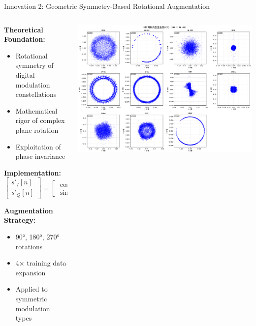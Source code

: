 \documentclass[aspectratio=169]{beamer}
\begin{document}
\begin{frame}{Innovation 2: Geometric Symmetry-Based Rotational Augmentation}
\begin{columns}
\begin{column}{0.5\textwidth}
\textbf{Theoretical Foundation:}
\begin{itemize}
\item Rotational symmetry of digital modulation constellations
\item Mathematical rigor of complex plane rotation
\item Exploitation of phase invariance
\end{itemize}

\textbf{Implementation:}
\begin{equation}
\begin{bmatrix} s'_I[n] \\ s'_Q[n] \end{bmatrix} = \begin{bmatrix} \cos\theta & -\sin\theta \\ \sin\theta & \cos\theta \end{bmatrix} \begin{bmatrix} s_I[n] \\ s_Q[n] \end{bmatrix}
\end{equation}

\textbf{Augmentation Strategy:}
\begin{itemize}
\item 90°, 180°, 270° rotations
\item 4× training data expansion
\item Applied to symmetric modulation types
\end{itemize}
\end{column}
\begin{column}{0.5\textwidth}
\includegraphics[width=\textwidth]{../paper/figure/constellation.png}
\end{column}
\end{columns}
\end{frame}
\end{document}
